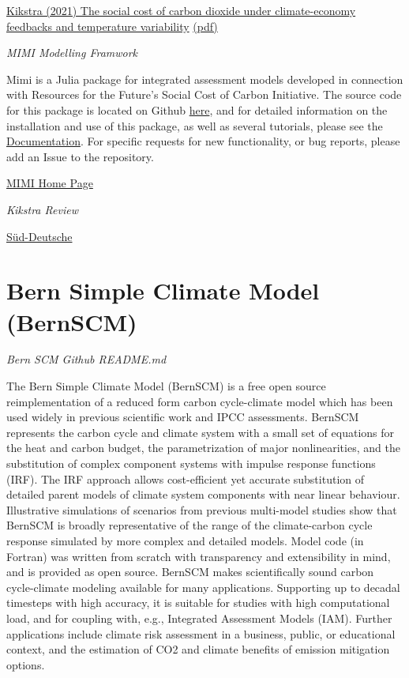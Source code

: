 \documentclass[
]{book}
\begin{document}
\href{https://iopscience.iop.org/article/10.1088/1748-9326/ac1d0b}{Kikstra (2021) The social cost of carbon dioxide under climate-economy feedbacks and temperature variability}
\href{pdf/Kikstra_2021_SSC_Climate_Economy_Feedbacks_PAGE.pdf}{(pdf)}

\emph{MIMI Modelling Framwork}

Mimi is a Julia package for integrated assessment models developed in connection with Resources for the Future's Social Cost of Carbon Initiative.
The source code for this package is located on Github \href{https://github.com/mimiframework/Mimi.jl}{here}, and for detailed information on the installation and use of this package, as well as several tutorials, please see the \href{https://www.mimiframework.org/Mimi.jl/stable/}{Documentation}. For specific requests for new functionality, or bug reports, please add an Issue to the repository.

\href{https://www.mimiframework.org/}{MIMI Home Page}

\emph{Kikstra Review}

\href{https://www.sueddeutsche.de/wissen/hochwasserkatastrophe-schaeden-kosten-klimawandel-co2-preis-hurrikan-1.5402770}{Süd-Deutsche}

\hypertarget{bern-simple-climate-model-bernscm}{%
\section{Bern Simple Climate Model (BernSCM)}\label{bern-simple-climate-model-bernscm}}

\emph{Bern SCM Github README.md}

The Bern Simple Climate Model (BernSCM) is a free open source reimplementation of a reduced form carbon cycle-climate model which has been used widely in previous scientific work and IPCC assessments.
BernSCM represents the carbon cycle and climate system with a small set of equations for the heat and carbon budget, the parametrization of major nonlinearities, and the substitution of complex component systems with impulse response functions (IRF). The IRF approach allows cost-efficient yet accurate substitution of detailed parent models of climate system components with near linear behaviour. Illustrative simulations of scenarios from previous multi-model studies show that BernSCM is broadly representative of the range of the climate-carbon cycle response simulated by more complex and detailed models. Model code (in Fortran) was written from scratch with transparency and extensibility in mind, and is provided as open source. BernSCM makes scientifically sound carbon cycle-climate modeling available for many applications. Supporting up to decadal timesteps with high accuracy, it is suitable for studies with high computational load, and for coupling with, e.g., Integrated Assessment Models (IAM). Further applications include climate risk assessment in a business, public, or educational context, and the estimation of CO2 and climate benefits of emission mitigation options.
\end{document}
